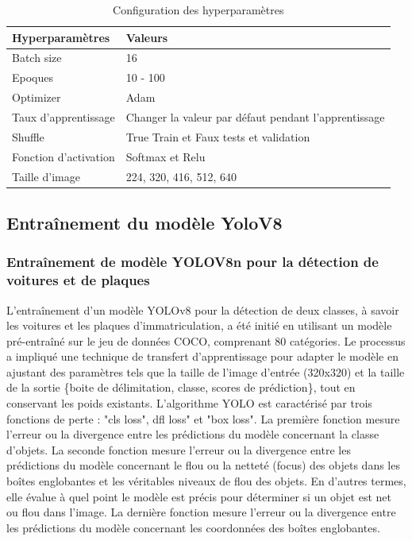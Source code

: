 \begin{table}[H]
	\centering
	\caption{ Configuration des hyperparamètres }
    \label{table:hyperparamètres}
	\begin{tabular}{|l|l|}
	\hline
	Hyperparamètres & Valeurs  \\
	\hline
	Batch size          & 16  \\
	Epoques              & 10 - 100\\
	Optimizer			& Adam\\
	Taux d'apprentissage       & Changer la valeur par défaut pendant l'apprentissage \\
	Shuffle             & True Train et Faux tests et validation \\
	Fonction d'activation &  Softmax  et Relu \\
       Taille d'image & 224, 320, 416, 512, 640 \\
	\hline  
	\end{tabular}%
\end{table}



\subsection{Entraînement du modèle YoloV8}
\subsubsection{Entraînement de modèle YOLOV8n pour la détection de voitures et de plaques}

L'entraînement d'un modèle YOLOv8 pour la détection de deux classes, à savoir les voitures et les plaques d'immatriculation, a été initié en utilisant un modèle pré-entraîné sur le jeu de données COCO, comprenant 80 catégories. Le processus a impliqué une technique de transfert d'apprentissage pour adapter le modèle en ajustant des paramètres tels que la taille de l'image d'entrée (320x320) et la taille de la sortie \{boite de délimitation, classe, scores de prédiction\}, tout en conservant les poids existants. L'algorithme YOLO est caractérisé par trois fonctions de perte : "cls loss", dfl loss" et "box loss". La première fonction mesure l'erreur ou la divergence entre les prédictions du modèle concernant la classe d'objets. La seconde fonction mesure l'erreur ou la divergence entre les prédictions du modèle concernant le flou ou la netteté (focus) des objets dans les boîtes englobantes et les véritables niveaux de flou des objets. En d'autres termes, elle évalue à quel point le modèle est précis pour déterminer si un objet est net ou flou dans l'image. La dernière fonction mesure l'erreur ou la divergence entre les prédictions du modèle concernant les coordonnées des boîtes englobantes.

